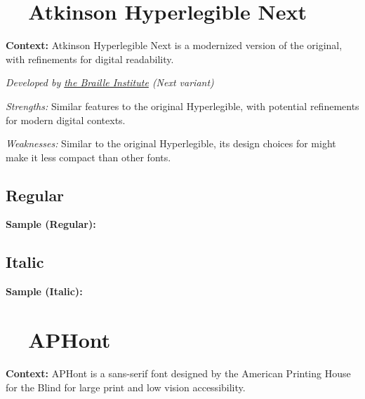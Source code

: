\pagebreak
\section{~~Atkinson Hyperlegible Next}\label{app5:troubleAtkinsonNext}
\noindent
\textbf{Context:} Atkinson Hyperlegible Next is a modernized version of the original, with refinements for digital readability.

\emph{Developed by \href{https://brailleinstitute.org/freefont}{the Braille Institute} (Next variant)}
\begin{raggedright}
	\emph{Strengths:} Similar  features to the original Hyperlegible, with potential refinements for modern digital contexts.

	\emph{Weaknesses:} Similar to the original Hyperlegible, its design choices for  might make it less compact than other fonts.

	\subsection{Regular}
	\noindent\textbf{Sample (Regular):}
	\FontSample{\atkinsonnextfont}

	\subsection{Italic}
	\noindent\textbf{Sample (Italic):}
	\FontSample{{\atkinsonnextfont\itshape}}
\end{raggedright}


\pagebreak
\section{~~APHont}\label{app5:trouble7}
\noindent
\textbf{Context:} APHont is a sans-serif font designed by the American Printing House for the Blind for large print and low vision accessibility.

